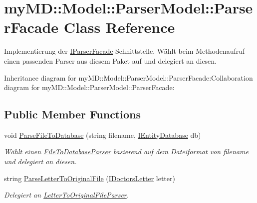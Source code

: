 \hypertarget{classmy_m_d_1_1_model_1_1_parser_model_1_1_parser_facade}{
\section{my\-MD::Model::Parser\-Model::Parser\-Facade Class Reference}
\label{d6/d36/classmy_m_d_1_1_model_1_1_parser_model_1_1_parser_facade}
}
Implementierung der \hyperlink{interfacemy_m_d_1_1_model_1_1_parser_model_1_1_i_parser_facade}{IParser\-Facade} Schnittstelle. W\"{a}hlt beim Methodenaufruf einen passenden Parser aus diesem Paket auf und delegiert an diesen.  


Inheritance diagram for my\-MD::Model::Parser\-Model::Parser\-Facade:Collaboration diagram for my\-MD::Model::Parser\-Model::Parser\-Facade:\subsection*{Public Member Functions}
\begin{CompactItemize}
\item 
void \hyperlink{classmy_m_d_1_1_model_1_1_parser_model_1_1_parser_facade_6ffe5b6c5af78ec3e9cdb29a04560a9f}{Parse\-File\-To\-Database} (string filename, \hyperlink{interfacemy_m_d_1_1_model_1_1_database_model_1_1_i_entity_database}{IEntity\-Database} db)
\begin{CompactList}\small\item\em W\"{a}hlt einen \hyperlink{classmy_m_d_1_1_model_1_1_parser_model_1_1_file_to_database_parser}{File\-To\-Database\-Parser} basierend auf dem Dateiformat von filename und delegiert an diesen. \item\end{CompactList}\item 
string \hyperlink{classmy_m_d_1_1_model_1_1_parser_model_1_1_parser_facade_b00612cc050463e46a4078ec61ef5bae}{Parse\-Letter\-To\-Original\-File} (\hyperlink{interfacemy_m_d_1_1_model_interface_1_1_data_model_interface_1_1_i_doctors_letter}{IDoctors\-Letter} letter)
\begin{CompactList}\small\item\em Delegiert an \hyperlink{classmy_m_d_1_1_model_1_1_parser_model_1_1_letter_to_original_file_parser}{Letter\-To\-Original\-File\-Parser}. \item\end{CompactList}\end{CompactItemize}


